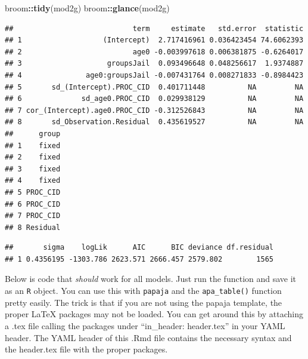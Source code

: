 \documentclass[]{article}
\newenvironment{Shaded}{\begin{snugshade}}{\end{snugshade}}
\newcommand{\KeywordTok}[1]{\textcolor[rgb]{0.13,0.29,0.53}{\textbf{#1}}}
\newcommand{\OperatorTok}[1]{\textcolor[rgb]{0.81,0.36,0.00}{\textbf{#1}}}
\newcommand{\NormalTok}[1]{#1}
\begin{document}
\begin{Shaded}
\begin{Highlighting}[]
\NormalTok{broom}\OperatorTok{::}\KeywordTok{tidy}\NormalTok{(mod2g)}
\NormalTok{broom}\OperatorTok{::}\KeywordTok{glance}\NormalTok{(mod2g)}
\end{Highlighting}
\end{Shaded}

\small

\begin{verbatim}
##                            term     estimate   std.error  statistic
## 1                   (Intercept)  2.717416961 0.036423454 74.6062393
## 2                          age0 -0.003997618 0.006381875 -0.6264017
## 3                    groupsJail  0.093496648 0.048256617  1.9374887
## 4               age0:groupsJail -0.007431764 0.008271833 -0.8984423
## 5       sd_(Intercept).PROC_CID  0.401711448          NA         NA
## 6              sd_age0.PROC_CID  0.029938129          NA         NA
## 7 cor_(Intercept).age0.PROC_CID -0.312526843          NA         NA
## 8       sd_Observation.Residual  0.435619527          NA         NA
##      group
## 1    fixed
## 2    fixed
## 3    fixed
## 4    fixed
## 5 PROC_CID
## 6 PROC_CID
## 7 PROC_CID
## 8 Residual
\end{verbatim}

\begin{verbatim}
##       sigma    logLik      AIC      BIC deviance df.residual
## 1 0.4356195 -1303.786 2623.571 2666.457 2579.802        1565
\end{verbatim}

Below is code that \emph{should} work for all models. Just run the
function and save it as an \texttt{R} object. You can use this with
\texttt{papaja} and the \texttt{apa\_table()} function pretty easily.
The trick is that if you are not using the papaja template, the proper
LaTeX packages may not be loaded. You can get around this by attaching a
.tex file calling the packages under ``in\_header: header.tex'' in your
YAML header. The YAML header of this .Rmd file contains the necessary
syntax and the header.tex file with the proper packages.
\end{document}
